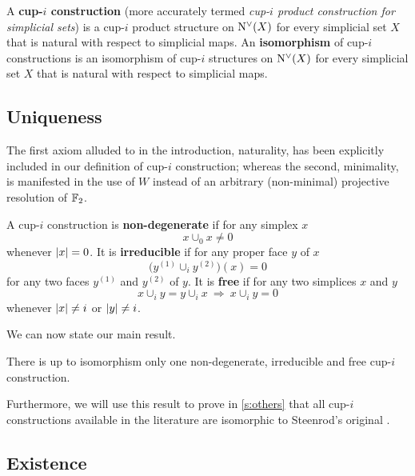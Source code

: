 \begin{definition}
	A \textbf{\mbox{cup-$i$} construction} (more accurately termed \emph{\mbox{cup-$i$} product construction for simplicial sets}) is a \mbox{cup-$i$} product structure on $\operatorname{N^{\vee}}(X)$ for every simplicial set $X$ that is natural with respect to simplicial maps.
	An \textbf{isomorphism} of \mbox{cup-$i$} constructions is an isomorphism of \mbox{cup-$i$} structures on $\operatorname{N^{\vee}}(X)$ for every simplicial set $X$ that is natural with respect to simplicial maps.
\end{definition}

\subsection{Uniqueness}

The first axiom alluded to in the introduction, naturality, has been explicitly included in our definition of \mbox{cup-$i$} construction; whereas the second, minimality, is manifested in the use of $W$ instead of an arbitrary (non-minimal) projective resolution of ${\mathbb{F}_2}$.

\begin{definition} \label{d:properties of cup-i constructions}
	A \mbox{cup-$i$} construction is \textbf{non-degenerate} if for any simplex $x$
	\[
	\boxed{x \cup_0 x \neq 0}
	\]
	whenever $\lvert x\rvert = 0$.
	It is \textbf{irreducible} if for any proper face $y$ of $x$
	\[
	\boxed{\Big( y^{(1)} \cup_{i} y^{(2)} \Big)(x) = 0}
	\]
	for any two faces $y^{(1)}$ and $y^{(2)}$ of $y$.
	It is \textbf{free} if for any two simplices $x$ and $y$
	\[
	\boxed{x \cup_{i} y = y \cup_{i} x} \
	\Longrightarrow \
	\boxed{x \cup_{i} y = 0}
	\]
	whenever $\lvert x\rvert \neq i$ or $\lvert y\rvert \neq i$.
\end{definition}

We can now state our main result.

\begin{theorem} \label{t:main}
	There is up to isomorphism only one non-degenerate, irreducible and free \mbox{cup-$i$} construction.
\end{theorem}

Furthermore, we will use this result to prove in \cref{s:others} that all \mbox{cup-$i$} constructions available in the literature are isomorphic to Steenrod's original \cite{steenrod1947products}.

\subsection{Existence}

